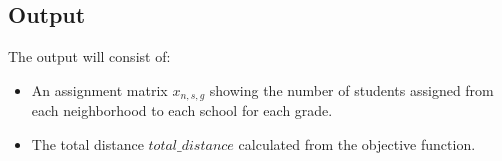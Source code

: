 \documentclass{article}
\begin{document}
\subsection*{Output}
The output will consist of:
\begin{itemize}
    \item An assignment matrix \( x_{n,s,g} \) showing the number of students assigned from each neighborhood to each school for each grade.
    \item The total distance \( total\_distance \) calculated from the objective function.
\end{itemize}
\end{document}
